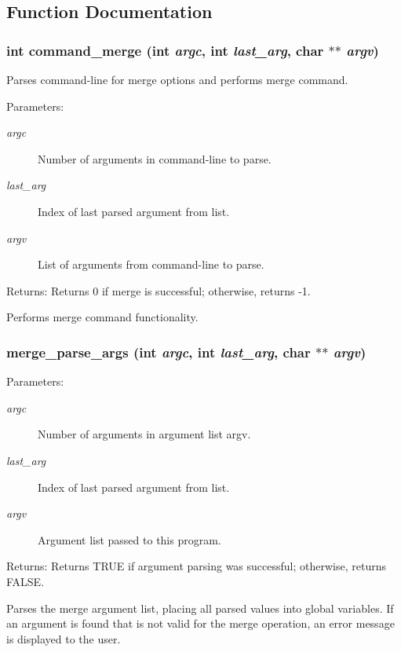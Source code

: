 \subsection{Function Documentation}
\subsubsection{\setlength{\rightskip}{0pt plus 5cm}int command\_\-merge (int {\em argc}, int {\em last\_\-arg}, char $\ast$$\ast$ {\em argv})}\label{merge_8c_a6}


Parses command-line for merge options and performs merge command.

\begin{Desc}
\item[Parameters:]
\begin{description}
\item[{\em argc}]Number of arguments in command-line to parse. \item[{\em last\_\-arg}]Index of last parsed argument from list. \item[{\em argv}]List of arguments from command-line to parse.\end{description}
\end{Desc}
\begin{Desc}
\item[Returns:]Returns 0 if merge is successful; otherwise, returns -1.\end{Desc}
Performs merge command functionality. 
\subsubsection{ merge\_\-parse\_\-args (int {\em argc}, int {\em last\_\-arg}, char $\ast$$\ast$ {\em argv})}\label{merge_8c_a5}


\begin{Desc}
\item[Parameters:]
\begin{description}
\item[{\em argc}]Number of arguments in argument list argv. \item[{\em last\_\-arg}]Index of last parsed argument from list. \item[{\em argv}]Argument list passed to this program.\end{description}
\end{Desc}
\begin{Desc}
\item[Returns:]Returns TRUE if argument parsing was successful; otherwise, returns FALSE.\end{Desc}
Parses the merge argument list, placing all parsed values into global variables. If an argument is found that is not valid for the merge operation, an error message is displayed to the user. 
